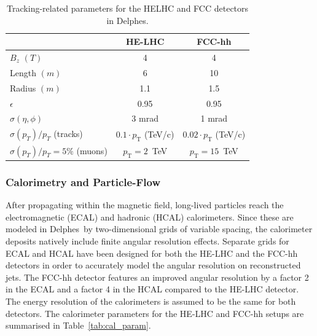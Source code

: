 \documentclass[a4paper,11pt]{article}
\newcommand{\pt}{\ensuremath{p_{\text{T}}}}
\newcommand{\delphes}{{\sc Delphes}}
\begin{document}
\begin {table}[htb!]
\begin{center}
\begin{tabular}{l||c|c}
& HE-LHC & FCC-hh \\
  \hline
  \hline
$B_z$ $(T)$ &  4 & 4 \\
  \hline
Length $(m)$ & 6 & 10 \\
 \hline
Radius $(m)$ & 1.1 &  1.5 \\
 \hline
$\epsilon$ & 0.95 & 0.95\\
\hline
$\sigma(\eta,\phi)$ & 3 mrad & 1 mrad \\
\hline
$\sigma(p_T)/p_T$ (tracks) &  $0.1\cdot \pt$ (TeV/c) &  $0.02\cdot \pt$ (TeV/c)\\
\hline
$\sigma(p_T)/p_T=5\%$ (muons) & $\pt=2$~TeV & $\pt=15$~TeV\\

\end{tabular}
\caption{Tracking-related parameters for the HELHC and FCC detectors in Delphes.}
\label{tab:trk_param}
\end{center}
\end{table}


\subsubsection{Calorimetry and Particle-Flow}
\label{appsub:calorimetry}

After propagating within the magnetic field, long-lived particles reach the electromagnetic (ECAL) and hadronic (HCAL) calorimeters. Since these are modeled in \delphes{}~by two-dimensional grids of variable spacing, the calorimeter deposits natively include finite angular resolution effects. Separate grids for ECAL and HCAL have been designed for both the HE-LHC and the FCC-hh detectors in order to accurately model the angular resolution on reconstructed jets. The FCC-hh detector features an improved angular resolution by a factor 2 in the ECAL and a factor 4 in the HCAL compared to the HE-LHC detector. The energy resolution of the calorimeters is assumed to be the same for both detectors. The calorimeter parameters for the HE-LHC and FCC-hh setups are summarised in Table~\ref{tab:cal_param}.
\end{document}
